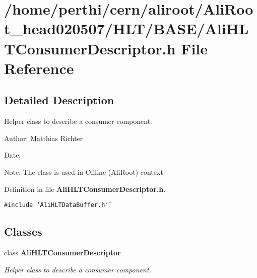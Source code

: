 \section{/home/perthi/cern/aliroot/Ali\-Root\_\-head020507/HLT/BASE/Ali\-HLTConsumer\-Descriptor.h File Reference}
\label{AliHLTConsumerDescriptor_8h}


\subsection{Detailed Description}
Helper class to describe a consumer component. 

\begin{Desc}
\item[Author:]Matthias Richter \end{Desc}
\begin{Desc}
\item[Date:]\end{Desc}
\begin{Desc}
\item[Note:]The class is used in Offline (Ali\-Root) context\end{Desc}


Definition in file {\bf Ali\-HLTConsumer\-Descriptor.h}.

{\tt \#include \char`\"{}Ali\-HLTData\-Buffer.h\char`\"{}}\par
\subsection*{Classes}
\begin{CompactItemize}
\item 
class {\bf Ali\-HLTConsumer\-Descriptor}
\begin{CompactList}\small\item\em Helper class to describe a consumer component. \item\end{CompactList}\end{CompactItemize}
